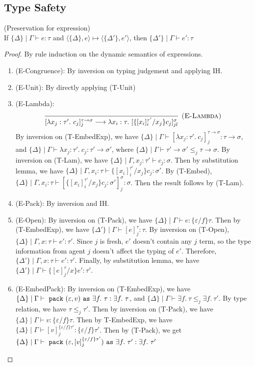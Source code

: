 \subsection{Type Safety}
\begin{lemma} (Preservation for expression)\\
If $\{\Delta\} \mid \Gamma \vdash e : \tau$ and $\langle \{\Delta\}, e\rangle \mapsto \langle \{\Delta'\}, e'\rangle$, then $\{\Delta'\} \mid \Gamma \vdash e' : \tau$
\begin{proof}
By rule induction on the dynamic semantics of expressions. 
\begin{enumerate}
\item (E-Congruence): By inversion on typing judgement and applying IH.
\item (E-Unit): By directly applying (T-Unit)
\item (E-Lambda): 
$$\infer[\textsc{(E-Lambda)}]
  {[\lambda x_j : \tau'.\ c_j]^{\tau \rightarrow \sigma}_{j} \longrightarrow \lambda x_i : \tau.\ [\{[x_i]^{\tau'}_{i}/x_j\}c_j]^\sigma_{jl}}
  {}$$
By inversion on (T-EmbedExp), we have $\{\Delta\} \mid \Gamma \vdash  [\lambda x_j : \tau'.\ c_j]^{\tau \rightarrow \sigma}_{j}: \tau \rightarrow \sigma$, and $\{\Delta\} \mid \Gamma \vdash \lambda x_j : \tau'.\ c_j : \tau' \rightarrow \sigma'$, where $\{\Delta\} \mid \Gamma \vdash \tau' \rightarrow \sigma' \leq_j \tau \rightarrow \sigma$. By inversion on (T-Lam), we have $\{\Delta\} \mid \Gamma, x_j : \tau' \vdash c_j : \sigma$. Then by substitution lemma, we have $\{\Delta\} \mid \Gamma, x_i : \tau  \vdash \{[x_i]^{\tau'}_i/x_j\}c_j : \sigma'$. By (T-Embed), 
$\{\Delta\} \mid \Gamma, x_i : \tau  \vdash [\{[x_i]^{\tau'}_i/x_j\}c_j : \sigma']^{\sigma}_j : \sigma$. Then the result follows by (T-Lam).

\item (E-Pack): By inversion and IH.
\item (E-Open): By inversion on (T-Pack), we have $\{\Delta\} \mid \Gamma \vdash e : \{\varepsilon /f\} \tau$. Then by (T-EmbedExp), we have $\{\Delta'\} \mid \Gamma \vdash [e]^\tau_j : \tau$. By inversion on (T-Open), $\{\Delta\} \mid \Gamma, x : \tau \vdash e' : \tau'$. Since $j$ is fresh, $e'$ doesn't contain any $j$ term, so the type information from agent $j$ doesn't affect the typing of $e'$. Therefore, $\{\Delta'\} \mid \Gamma, x : \tau \vdash e' : \tau'$. Finally, by substitution lemma, we have $\{\Delta'\} \mid \Gamma \vdash \{[e]^\tau_j / x \}e' : \tau'$.

\item (E-EmbedPack): By inversion on (T-EmbedExp), we have $\{\Delta\} \mid \Gamma \vdash \ \texttt{pack}\  (\varepsilon, v) \ \texttt{as}\  \exists f.\ \tau : \exists f.\ \tau$, and $\{\Delta\} \mid \Gamma \vdash \exists f.\ \tau \leq_j \exists f.\ \tau'$. By type relation, we have $\tau \leq_j \tau'$. Then by inversion on (T-Pack), we have $\{\Delta\} \mid \Gamma \vdash v :\{\varepsilon / f\}\tau$. Then by T-EmbedExp, we have $\{\Delta\}\mid\Gamma \vdash [v]^{\{\varepsilon / f\}\tau'}_j : \{\varepsilon / f\}\tau'$. Then by (T-Pack), we get $\{\Delta\}\mid\Gamma \vdash \ \texttt{pack}\  (\varepsilon, [v]^{\{\varepsilon / f\}\tau'}_j) \ \texttt{as}\  \exists f.\ \tau' :\exists f.\ \tau'$



\end{enumerate}
\end{proof}
\end{lemma}
